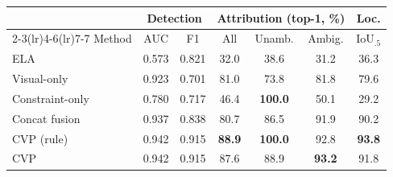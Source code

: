 \begin{tabular}{lcccccc}
\toprule
 & \multicolumn{2}{c}{Detection} & \multicolumn{3}{c}{Attribution (top-1, \%)} & Loc.\\
\cmidrule(lr){2-3}\cmidrule(lr){4-6}\cmidrule(lr){7-7}
Method & AUC & F1 & All & Unamb. & Ambig. & IoU$_{.5}$\\
\midrule
ELA & 0.573 & 0.821 & 32.0 & 38.6 & 31.2 & 36.3\\
Visual-only & 0.923 & 0.701 & 81.0 & 73.8 & 81.8 & 79.6\\
Constraint-only & 0.780 & 0.717 & 46.4 & \textbf{100.0} & 50.1 & 29.2\\
Concat fusion & 0.937 & 0.838 & 80.7 & 86.5 & 91.9 & 90.2\\
CVP (rule) & 0.942 & 0.915 & \textbf{88.9} & \textbf{100.0} & 92.8 & \textbf{93.8}\\
CVP & 0.942 & 0.915 & 87.6 & 88.9 & \textbf{93.2} & 91.8\\
\bottomrule
\end{tabular}
